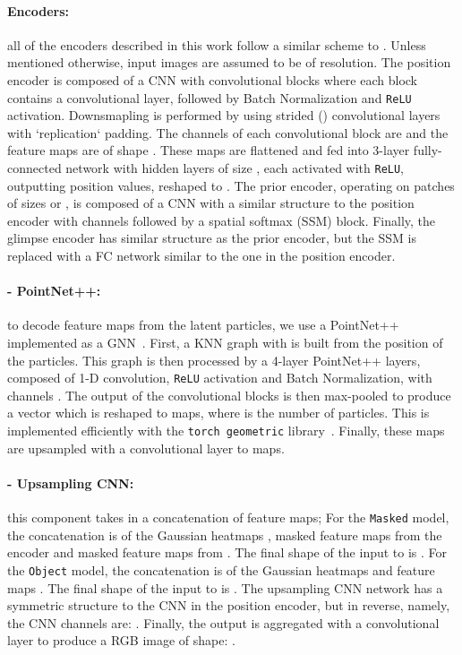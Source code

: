 \documentclass[nohyperref]{article}
\theoremstyle{plain}
\theoremstyle{definition}
\theoremstyle{remark}
\begin{document}
\paragraph{Encoders:} all of the encoders described in this work follow a similar scheme to \citet{jakab2018unsupervised}. Unless mentioned otherwise, input images are assumed to be of  resolution. The position encoder is composed of a CNN with convolutional blocks where each block contains a convolutional layer, followed by Batch Normalization and \texttt{ReLU} activation. Downsmapling is performed by using strided () convolutional layers with `replication` padding. The channels of each convolutional block are  and the feature maps are of shape . These maps are flattened and fed into 3-layer fully-connected network with hidden layers of size , each activated with \texttt{ReLU}, outputting  position values, reshaped to . The prior encoder, operating on patches of sizes  or , is composed of a CNN with a similar structure to the position encoder with channels  followed by a spatial softmax (SSM) block. Finally, the glimpse encoder has similar structure as the prior encoder, but the SSM is replaced with a FC network similar to the one in the position encoder.

\paragraph{ - PointNet++:} to decode feature maps from the latent particles, we use a PointNet++~\citep{qi2017pointnet++} implemented as a GNN~\cite{gnn09}. First, a KNN graph with  is built from the position of the particles. This graph is then processed by a 4-layer PointNet++ layers, composed of 1-D convolution, \texttt{ReLU} activation and Batch Normalization, with channels . The output of the convolutional blocks is then max-pooled to produce a vector which is reshaped to  maps, where  is the number of particles. This is implemented efficiently with the \texttt{torch geometric} library~\citep{feylensen19tgeom}. Finally, these maps are upsampled with a convolutional layer to  maps.

\paragraph{ - Upsampling CNN:} this component takes in a concatenation of feature maps; For the \texttt{Masked} model, the concatenation is of the Gaussian heatmaps , masked feature maps from the encoder  and masked feature maps from . The final shape of the input to  is . For the \texttt{Object} model, the concatenation is of the Gaussian heatmaps  and feature maps . The final shape of the input to  is .
The upsampling CNN network has a symmetric structure to the CNN in the position encoder, but in reverse, namely, the CNN channels are: . Finally, the output is aggregated with a  convolutional layer to produce a RGB image of shape: .
\end{document}
